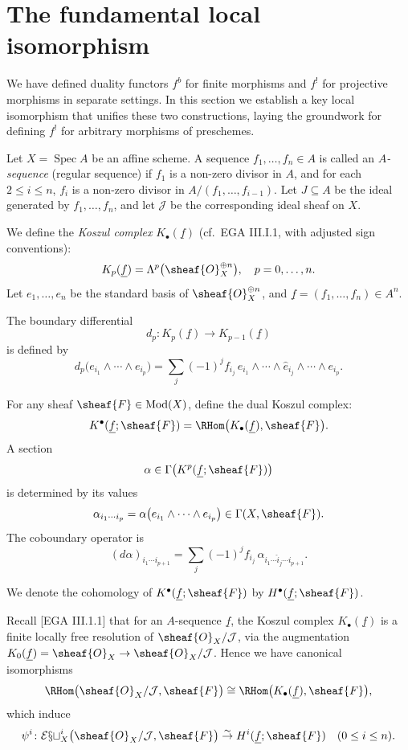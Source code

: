 \setcounter{page}{176}
\section{The fundamental local isomorphism}

We have defined duality functors \(f^b\) for finite morphisms and \(f^!\) for projective morphisms in separate settings. In this section we establish a key local isomorphism that unifies these two constructions, laying the groundwork for defining \(f^!\) for arbitrary morphisms of preschemes.

Let \(X = \operatorname{Spec}A\) be an affine scheme. A sequence \(f_1,\dots,f_n\in A\) is called an \textit{$A$-sequence} (regular sequence) if \(f_1\) is a non-zero divisor in \(A\), and for each \(2\le i\le n\), \(f_i\) is a non-zero divisor in \(A/(f_1,\dots,f_{i-1})\).
Let \(J\subseteq A\) be the ideal generated by \(f_1,\dots,f_n\), and let \(\mathcal{J}\) be the corresponding ideal sheaf on \(X\).

We define the \textit{Koszul complex} \(K_\bullet(\underline{f})\) (cf.\ EGA III.I.1, with adjusted sign conventions):
\[
K_{p}(\underline{f})=\Lambda^{p}\bigl(\sheaf{O}_X^{\oplus n}\bigr),\quad p=0,\dots,n .
\]
Let \(e_1,\dots,e_n\) be the standard basis of \(\sheaf{O}_X^{\oplus n}\), and \(\underline{f}=(f_1,\dots,f_n)\in A^n\).

\setcounter{page}{177}
The boundary differential
\[
d_{p}\colon K_{p}(\underline{f}) \to K_{p-1}(\underline{f})
\]
is defined by
\[
d_{p}\bigl(e_{i_1}\wedge\cdots\wedge e_{i_p}\bigr)
=\sum_{j} (-1)^j f_{i_j}\, e_{i_1}\wedge\cdots\wedge\hat{e}_{i_j}\wedge\cdots\wedge e_{i_p}.
\]

For any sheaf \(\sheaf{F}\in\operatorname{Mod}(X)\), define the dual Koszul complex:
\[
K^\bullet(\underline{f};\sheaf{F})
= \RHom\bigl(K_\bullet(\underline{f}),\sheaf{F}\bigr).
\]
A section
\[
\alpha \in \Gamma\big(K^{p}(\underline{f};\sheaf{F})\big)
\]
is determined by its values
\[
\alpha_{i_1\cdots i_p}
=\alpha\bigl(e_{i_1}\wedge\cdots\wedge e_{i_p}\bigr)
\in \Gamma(X,\sheaf{F}).
\]
The coboundary operator is
\[
(d\alpha)_{i_1\cdots i_{p+1}}
=\sum_j (-1)^j f_{i_j}\,\alpha_{i_1\cdots\hat{i}_j\cdots i_{p+1}}.
\]

We denote the cohomology of \(K^\bullet(\underline{f};\sheaf{F})\) by \(H^\bullet(\underline{f};\sheaf{F})\).

Recall [EGA III.1.1] that for an \(A\)-sequence \(\underline{f}\), the Koszul complex \(K_\bullet(\underline{f})\) is a finite locally free resolution of \(\sheaf{O}_X/\mathcal{J}\), via the augmentation \(K_0(\underline{f})=\sheaf{O}_X\to\sheaf{O}_X/\mathcal{J}\).
\setcounter{page}{178}
Hence we have canonical isomorphisms
\[
\RHom\bigl(\sheaf{O}_X/\mathcal{J},\sheaf{F}\bigr)
\cong \RHom\bigl(K_\bullet(\underline{f}),\sheaf{F}\bigr),
\]
which induce
\[
\psi^{i}\colon \mathcal{Ext}_{X}^{i}\bigl(\sheaf{O}_X/\mathcal{J},\sheaf{F}\bigr)
\stackrel{\sim}{\to} H^{i}(\underline{f};\sheaf{F})
\quad (0\le i\le n).
\]

